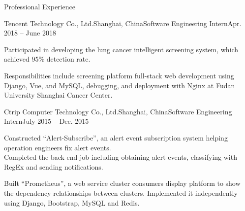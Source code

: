 \documentclass{resume_ucla} %
\begin{document}
\begin{rSection}{Professional Experience}

\begin{rSubsection}{Tencent Technology Co., Ltd.}{Shanghai, China}{Software Engineering Intern}{Apr. 2018 -- June 2018}
\item Participated in developing the lung cancer intelligent screening system, which achieved 95\% detection rate. 
\item Responsibilities include screening platform full-stack web development using Django, Vue, and MySQL, debugging, and deployment with Nginx at Fudan University Shanghai Cancer Center. 
\end{rSubsection}

\begin{rSubsection}{Ctrip Computer Technology Co., Ltd.}{Shanghai, China}{Software Engineering Intern}{July 2015 -- Dec. 2015}
\item Constructed ``Alert-Subscribe'', an alert event subscription system helping operation engineers fix alert events. 
\\ Completed the back-end job including obtaining alert events, classifying with RegEx and sending notifications.
\item Built ``Prometheus'', a web service cluster consumers display platform to show the dependency relationships between clusters. Implemented it independently using Django, Bootstrap, MySQL and Redis.
\end{rSubsection}

\end{rSection}

\end{document}
